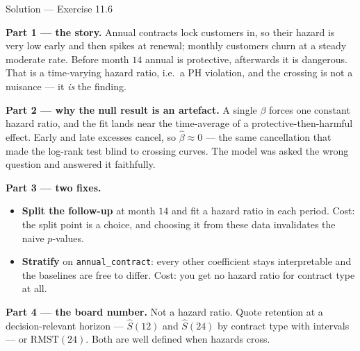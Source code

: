 \documentclass[aspectratio=169,11pt]{beamer}
\begin{document}
\begin{frame}{Solution --- Exercise 11.6}
  \footnotesize
\begin{solutionbox}
  \scriptsize
  \textbf{Part 1 --- the story.} Annual contracts lock customers in, so their hazard is
  very low early and then spikes at renewal; monthly customers churn at a steady moderate
  rate. Before month $14$ annual is protective, afterwards it is dangerous. That is a
  time-varying hazard ratio, i.e.\ a PH violation, and the crossing is not a nuisance ---
  it \emph{is} the finding.

  \medskip
  \textbf{Part 2 --- why the null result is an artefact.} A single $\beta$ forces one
  constant hazard ratio, and the fit lands near the time-average of a
  protective-then-harmful effect. Early and late excesses cancel, so
  $\hat\beta\approx0$ --- the same cancellation that made the log-rank test blind to
  crossing curves. The model was asked the wrong question and answered it faithfully.

  \medskip
  \textbf{Part 3 --- two fixes.}
  \begin{itemize}
    \item \textbf{Split the follow-up} at month $14$ and fit a hazard ratio in each
          period. Cost: the split point is a choice, and choosing it from these data
          invalidates the naive $p$-values.
    \item \textbf{Stratify} on \texttt{annual\_contract}: every other coefficient stays
          interpretable and the baselines are free to differ. Cost: you get no hazard
          ratio for contract type at all.
  \end{itemize}
  \medskip
  \textbf{Part 4 --- the board number.} Not a hazard ratio. Quote retention at a
  decision-relevant horizon --- $\hat S(12)$ and $\hat S(24)$ by contract type with
  intervals --- or $\mathrm{RMST}(24)$. Both are well defined when hazards cross.
\end{solutionbox}
\end{frame}
\end{document}
